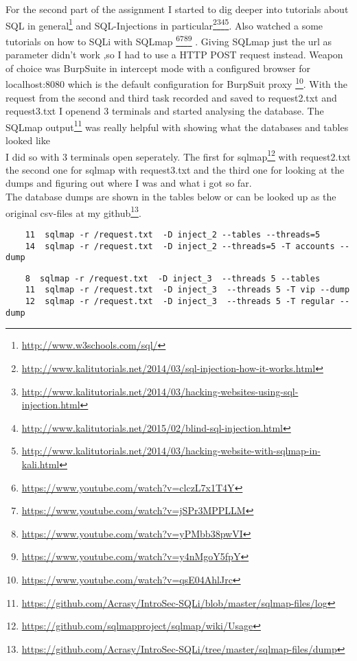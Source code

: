 \documentclass{scrartcl}
\begin{document}
	For the second part of the assignment I started to dig deeper into tutorials about SQL in general\footnote{\url{http://www.w3schools.com/sql/}} and  SQL-Injections in particular\footnote{\url{http://www.kalitutorials.net/2014/03/sql-injection-how-it-works.html}}\footnote{\url{http://www.kalitutorials.net/2014/03/hacking-websites-using-sql-injection.html}}\footnote{\url{http://www.kalitutorials.net/2015/02/blind-sql-injection.html}}\footnote{\url{http://www.kalitutorials.net/2014/03/hacking-website-with-sqlmap-in-kali.html}}. Also watched a some tutorials on how to SQLi with SQLmap \footnote{\url{https://www.youtube.com/watch?v=clczL7x1T4Y}}\footnote{\url{https://www.youtube.com/watch?v=jSPr3MPPLLM}}\footnote{\url{https://www.youtube.com/watch?v=yPMbb38pwVI}}\footnote{\url{https://www.youtube.com/watch?v=y4nMgoY5fpY}} .
	Giving SQLmap just the url as parameter didn't work ,so I had to use a HTTP POST request instead. Weapon of choice was BurpSuite in intercept mode with a configured browser for localhost:8080 which is the default configuration for BurpSuit proxy \footnote{\url{https://www.youtube.com/watch?v=qsE04AhlJrc}}.
	With the request from the second and third task recorded and saved to request2.txt and request3.txt I openend 3 terminals and started analysing the database. The SQLmap output\footnote{\url{https://github.com/Acrasy/IntroSec-SQLi/blob/master/sqlmap-files/log}} was really helpful with showing what the databases and tables looked like \\
	I did so with 3 terminals open seperately. The first for sqlmap\footnote{\url{https://github.com/sqlmapproject/sqlmap/wiki/Usage}} with request2.txt the second one for sqlmap with request3.txt and the third one for looking at the dumps and figuring out where I was and what i got so far.\\
	The database dumps are shown in the tables below or can be looked up as the original csv-files at my github\footnote{\url{https://github.com/Acrasy/IntroSec-SQLi/tree/master/sqlmap-files/dump}}.
	
	\begin{lstlisting}
	11  sqlmap -r /request.txt  -D inject_2 --tables --threads=5
	14  sqlmap -r /request.txt  -D inject_2 --threads=5 -T accounts --dump
	\end{lstlisting}
	
	\begin{lstlisting}
	8  sqlmap -r /request.txt  -D inject_3  --threads 5 --tables
	11  sqlmap -r /request.txt  -D inject_3  --threads 5 -T vip --dump
	12  sqlmap -r /request.txt  -D inject_3  --threads 5 -T regular --dump
	\end{lstlisting}
	
\end{document}
